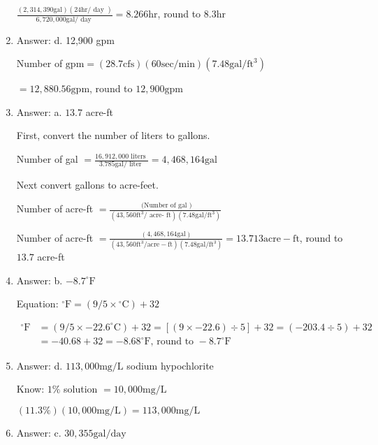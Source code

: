 \documentclass[10pt]{article}
\begin{document}
\begin{enumerate}
$\frac{(2,314,390 \mathrm{gal})(24 \mathrm{hr} / \text { day })}{6,720,000 \mathrm{gal} / \text { day }}=8.266 \mathrm{hr}$, round to $8.3 \mathrm{hr}$

  \item Answer: d. 12,900 gpm

Number of $\mathrm{gpm}=(28.7 \mathrm{cfs})(60 \mathrm{sec} / \mathrm{min})\left(7.48 \mathrm{gal} / \mathrm{ft}^{3}\right)$

$=12,880.56 \mathrm{gpm}$, round to $12,900 \mathrm{gpm}$

  \item Answer: a. $13.7$ acre-ft

First, convert the number of liters to gallons.

Number of gal $=\frac{16,912,000 \text { liters }}{3.785 \mathrm{gal} / \text { liter }}=4,468,164 \mathrm{gal}$

Next convert gallons to acre-feet.

Number of acre-ft $=\frac{\text { (Number of gal })}{\left(43,560 \mathrm{ft}^{3} / \text { acre- } \mathrm{ft}\right)\left(7.48 \mathrm{gal} / \mathrm{ft}^{3}\right)}$

Number of acre-ft $=\frac{(4,468,164 \mathrm{gal})}{\left(43,560 \mathrm{ft}^{3} / \mathrm{acre}-\mathrm{ft}\right)\left(7.48 \mathrm{gal} / \mathrm{ft}^{3}\right)}=13.713 \mathrm{acre}-\mathrm{ft}$, round to $13.7$ acre-ft

  \item Answer: b. $-8.7^{\circ} \mathrm{F}$

Equation: ${ }^{\circ} \mathrm{F}=\left(9 / 5 \times{ }^{\circ} \mathrm{C}\right)+32$

$$
\begin{aligned}
{ }^{\circ} \mathrm{F} &=\left(9 / 5 \times-22.6^{\circ} \mathrm{C}\right)+32=[(9 \times-22.6) \div 5]+32=(-203.4 \div 5)+32 \\
&=-40.68+32=-8.68^{\circ} \mathrm{F} \text {, round to }-8.7^{\circ} \mathrm{F}
\end{aligned}
$$

  \item Answer: d. $113,000 \mathrm{mg} / \mathrm{L}$ sodium hypochlorite

Know: $1 \%$ solution $=10,000 \mathrm{mg} / \mathrm{L}$

$(11.3 \%)(10,000 \mathrm{mg} / \mathrm{L})=113,000 \mathrm{mg} / \mathrm{L}$

  \item Answer: c. $30,355 \mathrm{gal} / \mathrm{day}$


\end{enumerate}
\end{document}
